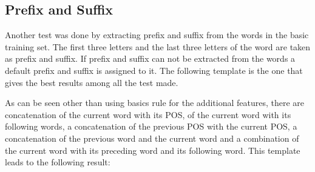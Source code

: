 \documentclass[11pt,a4paper]{article}
\begin{document}
\subsection{Prefix and Suffix}
Another test was done by extracting prefix and suffix from the words in the basic training set. The first three letters and the last three letters of the word are taken as prefix and suffix. If prefix and suffix can not be extracted from the words a default prefix and suffix is assigned to it.
The following template is the one that gives the best results among all the test made.
\begin{table}[H]
    \begin{center}
    \end{center}
    \caption{\label{t9} Best template for Prefix+ Suffix}
\end{table}
As can be seen other than using basics rule for the additional features, there are concatenation of the current word with its POS, of the current word with its following words, a concatenation of the previous POS with the current POS, a concatenation of the previous word and the current word and a combination of the current word with its preceding word and its following word. This template leads to the following result:
\end{document}

